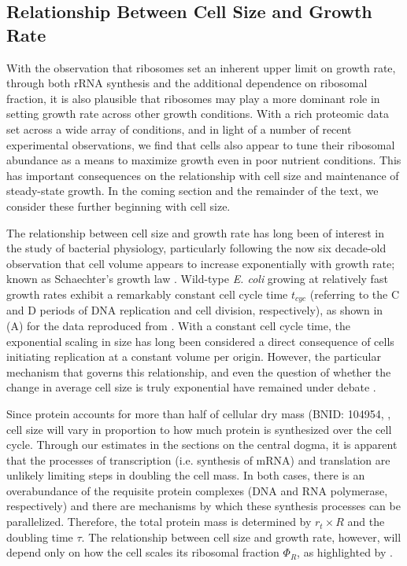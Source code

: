 \subsection{Relationship Between Cell Size and Growth Rate}
With the observation that ribosomes set an inherent upper limit on growth
rate, through both rRNA synthesis and the additional dependence on ribosomal
fraction, it is also plausible that ribosomes may play a more dominant role
in setting growth rate across other growth conditions. With a rich proteomic
data set across a wide array of conditions, and in light of a number of
recent experimental observations, we find that cells also appear to tune
their ribosomal abundance as a means to maximize growth even in poor nutrient
conditions. This has important consequences on the relationship with cell
size and maintenance of steady-state growth. In the coming section and the
remainder of the text, we consider these further beginning with cell size.

The relationship between cell size and growth rate has long been of interest in
the study of bacterial physiology, particularly following the now six decade-old observation
that cell volume appears to increase exponentially with growth rate; known as
Schaechter's growth law  \citep{schaechter1958, taheriaraghi2015}. Wild-type
\textit{E. coli} growing at relatively fast growth rates exhibit a remarkably
constant cell cycle time $t_{cyc}$ (referring to the C and D periods of DNA
replication and cell division, respectively), as shown in
(A) for the data reproduced from \cite{si2017}.
With a constant cell cycle time, the exponential scaling in size has long been
considered a direct consequence of cells initiating replication at a constant
volume per origin. However, the particular mechanism that governs this
relationship, and even the question of whether the change in average cell size
is truly exponential  have remained under debate \citep{si2017, harris2018}.

Since protein accounts for more than half of cellular dry mass (BNID: 104954,
\cite{milo2010, bremer2008, basan2015}, cell size will vary in proportion to how much protein is
synthesized over the cell cycle.  Through our estimates in the sections on the
central dogma, it is apparent that the processes of transcription (i.e.
synthesis of mRNA) and translation are unlikely limiting steps in doubling the
cell mass. In both cases, there is an overabundance of the requisite protein
complexes (DNA and RNA polymerase, respectively) and there are mechanisms by
which these synthesis processes can be parallelized. Therefore, the total protein mass is determined by $r_t \times R$ and the doubling time
$\tau$. The relationship between cell size and growth rate, however, will
depend only on how the cell scales its ribosomal fraction $\Phi_R$, as highlighted by
.


